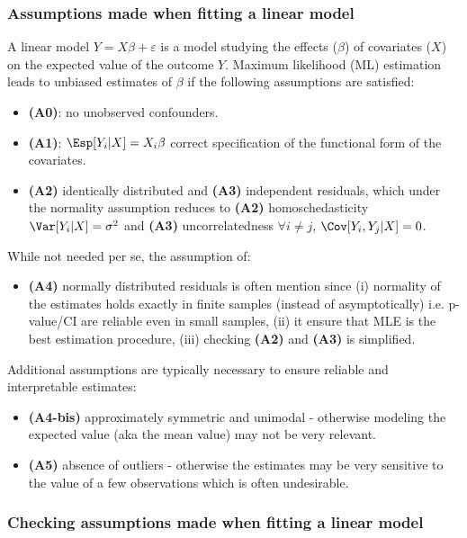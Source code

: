 \documentclass{article}
\begin{document}
\subsubsection{Assumptions made when fitting a linear model}
\label{sec:org2d68e5f}
A linear model \(Y = X \beta + \varepsilon\) is a model studying the
 effects (\(\beta\)) of covariates (\(X\)) on the expected value of
 the outcome \(Y\). Maximum likelihood (ML) estimation leads to
 unbiased estimates of \(\beta\) if the following assumptions are
 satisfied:
\begin{itemize}
\item \textbf{(A0)}: no unobserved confounders.
\item \textbf{(A1)}: \(\Esp[Y_i|X] = X_i \beta\) correct specification of the
functional form of the covariates.
\item \textbf{(A2)} identically distributed and \textbf{(A3)} independent residuals, which
under the normality assumption reduces to \textbf{(A2)} homoschedasticity
\(\Var[Y_i|X]= \sigma^2\) and \textbf{(A3)} uncorrelatedness \(\forall i \neq
  j\), \(\Cov[Y_i,Y_j|X]= 0\).
\end{itemize}
While not needed per se, the assumption of:
\begin{itemize}
\item \textbf{(A4)} normally distributed residuals is often mention since (i)
normality of the estimates holds exactly in finite samples (instead
of asymptotically) i.e. p-value/CI are reliable even in small
samples, (ii) it ensure that MLE is the best estimation procedure,
(iii) checking \textbf{(A2)} and \textbf{(A3)} is simplified.
\end{itemize}
Additional assumptions are typically necessary to ensure reliable and
interpretable estimates:
\begin{itemize}
\item \textbf{(A4-bis)} approximately symmetric and unimodal - otherwise modeling the
expected value (aka the mean value) may not be very relevant.
\item \textbf{(A5)} absence of outliers - otherwise the estimates may be very
sensitive to the value of a few observations which is often
undesirable.
\end{itemize}

\subsubsection{Checking assumptions made when fitting a linear model}
\label{sec:orgc2b125d}
\end{document}
